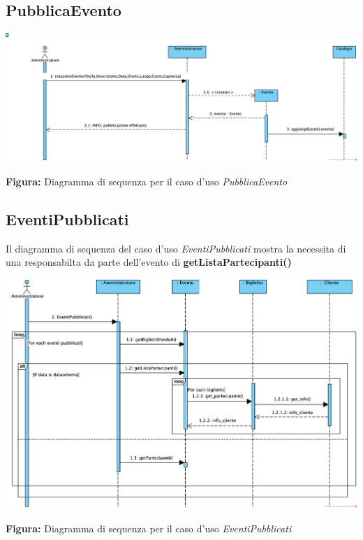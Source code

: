 \subsection{PubblicaEvento}

\begin{center}
    \vspace{3ex}
    \includegraphics[width=\linewidth]{assets/casid'uso/PubblicaEvento.png}
    
    \vspace{1ex}
    \textbf{Figura:} Diagramma di sequenza per il caso d’uso \textit{PubblicaEvento}
\end{center}
\subsection{EventiPubblicati}

\begin{center}
	Il diagramma di sequenza del caso d’uso \textit{EventiPubblicati} mostra la necessita di una responsabilta da parte dell'evento di \textbf{getListaPartecipanti()}

    \vspace{2ex}
    \includegraphics[width=0.8\linewidth]{assets/casid'uso/ConsultaInformazioniEvento.png}

    \vspace{1ex}
    \textbf{Figura:} Diagramma di sequenza per il caso d’uso \textit{EventiPubblicati}
\end{center}


